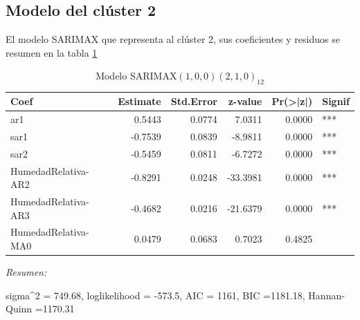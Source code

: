 \documentclass[12pt,oneside]{book}\usepackage[]{graphicx}\usepackage[]{color}
\newenvironment{knitrout}{}{} %
\theoremstyle{definition} %
\begin{document}
\subsection{Modelo del clúster 2}




El modelo SARIMAX que representa al clúster 2, sus coeficientes y residuos se resumen en la tabla \ref{tab:sarimax_cl2}

\begin{knitrout}
\color{fgcolor}\begin{table}

\caption{\label{tab:unnamed-chunk-102}\label{tab:sarimax_cl2}Modelo SARIMAX$(1,0,0)(2,1,0)_{12}$}
\centering
\begin{threeparttable}
\begin{tabular}[t]{lrrrrl}
\toprule
Coef & Estimate & Std.Error & z-value & Pr(>|z|) & Signif\\
\midrule
\rowcolor{gray!6}  ar1 & 0.5443 & 0.0774 & 7.0311 & 0.0000 & ***\\
sar1 & -0.7539 & 0.0839 & -8.9811 & 0.0000 & ***\\
\rowcolor{gray!6}  sar2 & -0.5459 & 0.0811 & -6.7272 & 0.0000 & ***\\
HumedadRelativa-AR2 & -0.8291 & 0.0248 & -33.3981 & 0.0000 & ***\\
\rowcolor{gray!6}  HumedadRelativa-AR3 & -0.4682 & 0.0216 & -21.6379 & 0.0000 & ***\\
\addlinespace
HumedadRelativa-MA0 & 0.0479 & 0.0683 & 0.7023 & 0.4825 & \\
\bottomrule
\end{tabular}
\begin{tablenotes}
\item \textit{Resumen:} 
\item sigma\textasciicircum{}2 = 749.68, loglikelihood = -573.5, AIC = 1161, BIC =1181.18, Hannan-Quinn =1170.31
\end{tablenotes}
\end{threeparttable}
\end{table}


\end{knitrout}
\end{document}
